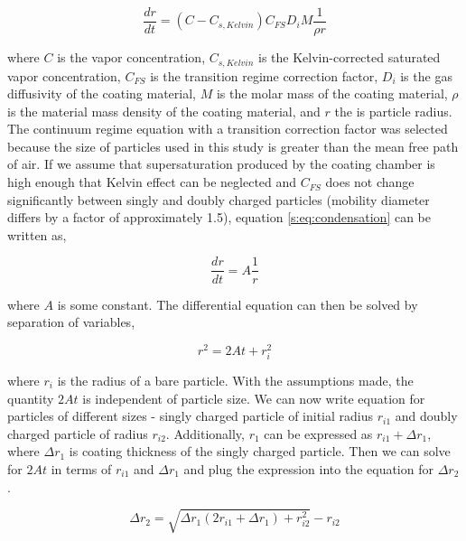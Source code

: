 \documentclass[12pt]{article}
\begin{document}
\begin{equation}
    \frac{dr}{dt}=\left(C-C_{s,Kelvin}\right)C_{FS}D_iM\frac{1}{\rho r}
    \label{s:eq:condensation}
\end{equation}

\noindent where $C$ is the vapor concentration, $C_{s,Kelvin}$ is the Kelvin-corrected saturated vapor concentration, $C_{FS}$ is the transition regime correction factor, $D_i$ is the gas diffusivity of the coating material, $M$ is the molar mass of the coating material, $\rho$ is the material mass density of the coating material, and $r$ the is particle radius. The continuum regime equation with a transition correction factor was selected because the size of particles used in this study is greater than the mean free path of air. If we assume that supersaturation produced by the coating chamber is high enough that Kelvin effect can be neglected and $C_{FS}$ does not change significantly between singly and doubly charged particles (mobility diameter differs by a factor of approximately 1.5), equation \ref{s:eq:condensation} can be written as,

\begin{equation}
    \frac{dr}{dt}=A\frac{1}{r}
\end{equation}

\noindent where $A$ is some constant. The differential equation can then be solved by separation of variables,

\begin{equation}
    r^2=2At+r_i^2
\end{equation}

\noindent where $r_i$ is the radius of a bare particle. With the assumptions made, the quantity $2At$ is independent of particle size. We can now write equation for particles of different sizes - singly charged particle of initial radius $r_{i1}$ and doubly charged particle of radius $r_{i2}$. Additionally, $r_1$ can be expressed as $r_{i1}+\Delta r_1$, where $\Delta r_1$ is coating thickness of the singly charged particle. Then we can solve for $2At$ in terms of $r_{i1}$ and $\Delta r_1$ and plug the expression into the equation for $\Delta r_2$.

\begin{equation}
    \Delta r_2=\sqrt{\Delta r_1\left(2r_{i1}+\Delta r_1\right)+r_{i2}^2}-r_{i2}
    \label{s:eq:thickness}
\end{equation}
\end{document}

